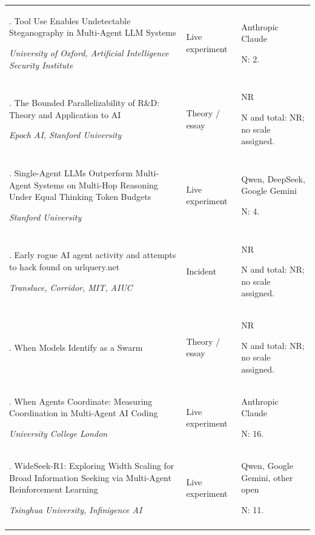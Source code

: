 \begin{longtable}{@{}>{\raggedright\arraybackslash}p{}>{\raggedright\arraybackslash}p{}>{\raggedright\arraybackslash}p{}@{}}
136. Tool Use Enables Undetectable Steganography in Multi-Agent LLM Systems \citep{tool-steganography}\par\emph{University of Oxford, Artificial Intelligence Security Institute} & Live experiment & Anthropic Claude\par N: 2. \\ \addlinespace[2pt]
137. The Bounded Parallelizability of R\&D: Theory and Application to AI \citep{trammell-parallelizability}\par\emph{Epoch AI, Stanford University} & Theory / essay & NR\par N and total: NR; no scale assigned. \\ \addlinespace[2pt]
138. Single-Agent LLMs Outperform Multi-Agent Systems on Multi-Hop Reasoning Under Equal Thinking Token Budgets \citep{tran-kiela-equal-budget}\par\emph{Stanford University} & Live experiment & Qwen, DeepSeek, Google Gemini\par N: 4. \\ \addlinespace[2pt]
139. Early rogue AI agent activity and attempts to hack found on urlquery.net \citep{transluce-agent-activity}\par\emph{Transluce, Corridor, MIT, AIUC} & Incident & NR\par N and total: NR; no scale assigned. \\ \addlinespace[2pt]
140. When Models Identify as a Swarm \citep{vidal-models-identify-as-swarm} & Theory / essay & NR\par N and total: NR; no scale assigned. \\ \addlinespace[2pt]
141. When Agents Coordinate: Measuring Coordination in Multi-Agent AI Coding \citep{when-agents-coordinate}\par\emph{University College London} & Live experiment & Anthropic Claude\par N: 16. \\ \addlinespace[2pt]
142. WideSeek-R1: Exploring Width Scaling for Broad Information Seeking via Multi-Agent Reinforcement Learning \citep{wideseek-r1}\par\emph{Tsinghua University, Infinigence AI} & Live experiment & Qwen, Google Gemini, other open\par N: 11. \\ \addlinespace[2pt]

\end{longtable}
